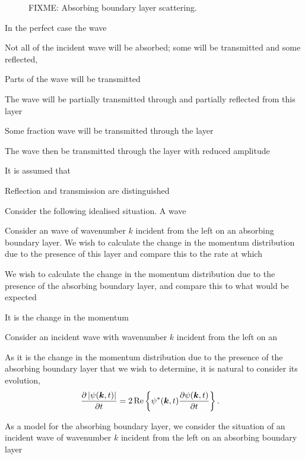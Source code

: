 \begin{figure}
    \centering
    \caption{\label{Peaks:AbsorbingBoundaryLayerScattering} FIXME: Absorbing boundary layer scattering.}
\end{figure}




In the perfect case the wave 

Not all of the incident wave will be absorbed; some will be transmitted and some reflected, 


Parts of the wave will be transmitted

The wave will be partially transmitted through and partially reflected from this layer 

Some fraction wave will be transmitted through the layer 

The wave  then be transmitted through the layer with reduced amplitude


It is assumed that 


Reflection and transmission are distinguished 


Consider the following idealised situation. A wave 


Consider an wave of wavenumber $k$ incident from the left on an absorbing boundary layer. We wish to calculate the change in the momentum distribution due to the presence of this layer and compare this to the rate at which 











We wish to calculate the change in the momentum distribution due to the presence of the absorbing boundary layer, and compare this to what would be expected 

It is the change in the momentum


Consider an incident wave with wavenumber $k$ incident from the left on an 

As it is the change in the momentum distribution due to the presence of the absorbing boundary layer that we wish to determine, it is natural to consider its evolution,
\begin{align}
    \frac{\partial \left|\psi(\bm{k}, t)\right|}{\partial t} &= 2 \operatorname{Re}\left\{ \psi^*(\bm{k}, t) \frac{\partial \psi(\bm{k}, t)}{\partial t}\right\}.
\end{align}

As a model for the absorbing boundary layer, we consider the situation of an incident wave of wavenumber $k$ incident from the left on an absorbing boundary layer 


